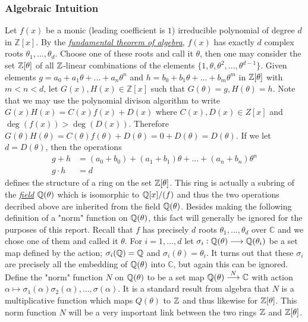  \subsubsection{Algebraic Intuition} \label{intuition}
    Let $f(x)$ be a monic (leading coefficient is $1$) irreducible polynomial of degree $d$ in $\mathbb{Z}[x]$. By the \hyperref[fun]{\textit{fundamental theorem of algebra}}, $f(x)$ has exactly $d$ complex roots $\theta_1, ... , \theta_d$. Choose one of these roots and call it $\theta$, then one may consider the set $\mathbb{Z}[\theta]$ of all $\mathbb{Z}$-linear combinations of the elements $\lbrace 1,\theta,\theta^2,...,\theta^{d-1} \rbrace $. Given elements $g =  a_0 + a_1\theta + ... + a_n\theta^n $ and $ h= b_0 + b_1 \theta + ... + b_m \theta^m $ in $ \mathbb{Z}[\theta]$ with $m < n < d$, let $G(x),H(x) \in \mathbb{Z}[x] $ such that $G(\theta) = g, H(\theta) = h $. Note that we may use the polynomial divison algorithm to write $G(x)H(x) = C(x)f(x) + D(x)$ where $C(x), D(x) \in Z[x]$ and $\deg(f(x)) >  \deg (D(x))$. Therefore $ G(\theta) H(\theta) = C(\theta)f(\theta) + D(\theta) = 0 + D(\theta) = D(\theta) $. If we let $d = D(\theta)$, then the operations  
    \begin{align*}
    g+ h &=  (a_0 + b_0) + (a_1 + b_1) \theta + \dots + (a_n + b_n )\theta^n \\
    g \cdot  h &= d
    \end{align*}
    defines the structure of a ring on the set $\mathbb{Z}[\theta]$. This ring is actually a subring of the \hyperref[field]{\textit{field}} $\mathbb{Q}(\theta)$ which is isomorphic to $\mathbb{Q}[x]/(f)$ and thus the two operations decribed above are inherited from the field $\mathbb{Q}(\theta)$. Besides making the following definition of a "norm" function on $\mathbb{Q}(\theta)$, this fact will generally be ignored for the purposes of this report. Recall that $f$ has precisely $d$ roots $\theta_1, ... , \theta_d$ over $\mathbb{C}$ and we chose one of them and called it $\theta$. For $i = 1,...,d$ let $\sigma_i : \mathbb{Q}(\theta) \longrightarrow \mathbb{Q}(\theta_i)$ be a set map defined by the action; $\sigma_i(\mathbb{Q}) = \mathbb{Q}$ and $\sigma_i(\theta) = \theta_i$. It turns out that these $\sigma_i$ are precisely all the embedding of $\mathbb{Q}(\theta) $ into $\mathbb{C}$, but again this can be ignored. Define the "norm" function $N$ on $\mathbb{Q}(\theta)$ to be a set map $\mathbb{Q}(\theta) \overset{N}{\longrightarrow} \mathbb{C}$ with action $\alpha \mapsto \sigma_1(\alpha) \sigma_2(\alpha), ... , \sigma(\alpha)$. It is a standard result from algebra that $N$ is a multiplicative function which maps $Q(\theta)$ to $\mathbb{Z}$ and thus likewise for $\mathbb{Z}[\theta]$. This norm function $N$ will be a very important link between the two rings $\mathbb{Z}$ and $\mathbb{Z}[\theta]$. \\

